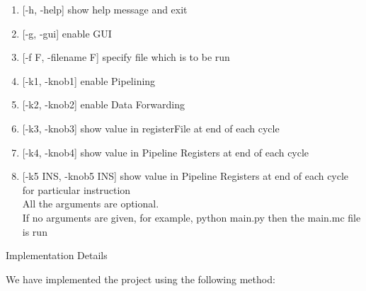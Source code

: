 \documentclass{article}
\begin{document}
\begin{enumerate}

  \item {[-h, -help]}        show help message and exit
  \item {[-g, -gui]}           enable GUI
  \item {[-f F, -filename F]}  specify file which is to be run
  \item {[-k1, -knob1]}        enable Pipelining
  \item {[-k2, -knob2]}        enable Data Forwarding
  \item {[-k3, -knob3]}        show value in registerFile at end of each cycle
  \item {[-k4, -knob4]}        show value in Pipeline Registers at end of each cycle
  \item {[-k5 INS, -knob5 INS]}  show value in Pipeline Registers at end of each cycle for
                     particular instruction\\
All the arguments are optional.\\
If no arguments are given, for example, python main.py 
then the main.mc file is run
\end{enumerate}
\newpage
\begin{centering}
\begin{Huge}
\textsf{Implementation Details}\\
\end{Huge}
\end{centering}
\protect\vspace{1.0cm}
We have implemented the project using the following method:\\
\end{document}
